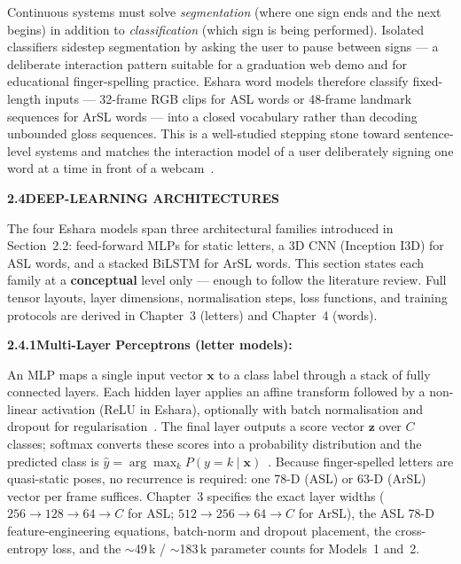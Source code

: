 \noindent Continuous systems must solve \emph{segmentation} (where one sign ends and the next begins) in addition to \emph{classification} (which sign is being performed). Isolated classifiers sidestep segmentation by asking the user to pause between signs --- a deliberate interaction pattern suitable for a graduation web demo and for educational finger-spelling practice. Eshara word models therefore classify fixed-length inputs --- 32-frame RGB clips for ASL words or 48-frame landmark sequences for ArSL words --- into a closed vocabulary rather than decoding unbounded gloss sequences. This is a well-studied stepping stone toward sentence-level systems and matches the interaction model of a user deliberately signing one word at a time in front of a webcam~\cite{li2020wlasl,sidig2021karsl,pigou2018sign}.\par\vspace{0.3cm}

\noindent\textbf{2.4\quad DEEP-LEARNING ARCHITECTURES}\par
{}
\vspace{0.2cm}

\noindent The four Eshara models span three architectural families introduced in Section~2.2: feed-forward MLPs for static letters, a 3D CNN (Inception I3D) for ASL words, and a stacked BiLSTM for ArSL words. This section states each family at a \textbf{conceptual} level only --- enough to follow the literature review. Full tensor layouts, layer dimensions, normalisation steps, loss functions, and training protocols are derived in Chapter~3 (letters) and Chapter~4 (words).\par\vspace{0.2cm}

\noindent\textbf{2.4.1\quad Multi-Layer Perceptrons (letter models):}\par
{}
\vspace{0.3cm}

\noindent An MLP maps a single input vector $\mathbf{x}$ to a class label through a stack of fully connected layers. Each hidden layer applies an affine transform followed by a non-linear activation (ReLU in Eshara), optionally with batch normalisation and dropout for regularisation~\cite{ioffe2015batchnorm,srivastava2014dropout}. The final layer outputs a score vector $\mathbf{z}$ over $C$ classes; softmax converts these scores into a probability distribution and the predicted class is $\hat{y} = \arg\max_k P(y{=}k \mid \mathbf{x})$~\cite{szegedy2016rethinking}. Because finger-spelled letters are quasi-static poses, no recurrence is required: one 78-D (ASL) or 63-D (ArSL) vector per frame suffices. Chapter~3 specifies the exact layer widths ($256 \rightarrow 128 \rightarrow 64 \rightarrow C$ for ASL; $512 \rightarrow 256 \rightarrow 64 \rightarrow C$ for ArSL), the ASL 78-D feature-engineering equations, batch-norm and dropout placement, the cross-entropy loss, and the $\sim$49\,k / $\sim$183\,k parameter counts for Models~1 and~2.\par\vspace{0.2cm}


